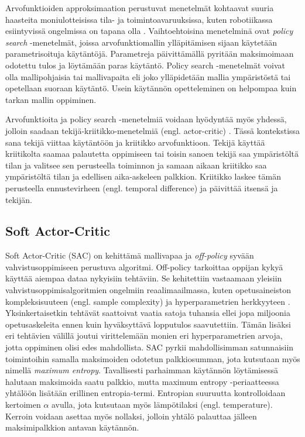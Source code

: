 \documentclass[utf8]{gradu3}
\begin{document}
Arvofunktioiden approksimaation perustuvat menetelmät kohtaavat suuria haasteita moniulotteisissa tila- ja toimintoavaruuksissa, kuten robotiikassa esiintyvissä ongelmissa on tapana olla \parencite{arulkumaran2017brief,deisenroth2013survey}. Vaihtoehtoisina menetelminä ovat \textit{policy search} -menetelmät, joissa arvofunktiomallin ylläpitämisen sijaan käytetään parametrisoituja käytäntöjä. Parametreja päivittämällä pyritään maksimoimaan odotettu tulos ja löytämään paras käytäntö. Policy search -menetelmät voivat olla mallipohjaisia tai mallivapaita eli joko ylläpidetään mallia ympäristöstä tai opetellaan suoraan käytäntö. Usein käytännön opetteleminen on helpompaa kuin tarkan mallin oppiminen.

Arvofunktioita ja policy search -menetelmiä voidaan hyödyntää myös yhdessä, jolloin saadaan tekijä-kriitikko-menetelmiä (engl. actor-critic) \parencite{arulkumaran2017brief}. Tässä kontekstissa sana tekijä viittaa käytäntöön ja kriitikko arvofunktioon. Tekijä käyttää kriitikolta saamaa palautetta oppimiseen tai toisin sanoen tekijä saa ympäristöltä tilan ja valitsee sen perusteella toiminnon ja samaan aikaan kriitikko saa ympäristöltä tilan ja edellisen aika-askeleen palkkion. Kriitikko laskee tämän perusteella ennustevirheen (engl. temporal difference) ja päivittää itsensä ja tekijän.

\subsection{Soft Actor-Critic}

Soft Actor-Critic (SAC) on \textcite{haarnoja2018soft} kehittämä mallivapaa ja \textit{off-policy} syvään vahvistusoppimiseen perustuva algoritmi. Off-policy tarkoittaa oppijan kykyä käyttää aiempaa dataa nykyisiin tehtäviin. Se kehitettiin vastaamaan yleisiin vahvistusoppimisalgoritmien ongelmiin reaalimaailmassa, kuten opetusaineiston kompleksisuuteen (engl. sample complexity) ja hyperparametrien herkkyyteen \parencite{haarnoja2018app}. Yksinkertaisetkin tehtävät saattoivat vaatia satoja tuhansia ellei jopa miljoonia opetusaskeleita ennen kuin hyväksyttävä lopputulos saavutettiin. Tämän lisäksi eri tehtävien välillä joutui virittelemään monien eri hyperparametrien arvoja, jotta oppiminen olisi edes mahdollista. SAC pyrkii mahdollisimman satunnaisiin toimintoihin samalla maksimoiden odotetun palkkiosumman, jota kutsutaan myös nimellä \textit{maximum entropy}. Tavallisesti parhaimman käytännön löytämisessä halutaan maksimoida saatu palkkio, mutta maximum entropy -periaatteessa yhtälöön lisätään erillinen entropia-termi. Entropian suuruutta kontrolloidaan kertoimen $\alpha$ avulla, jota kutsutaan myös lämpötilaksi (engl. temperature). Kerroin voidaan asettaa myös nollaksi, jolloin yhtälö palauttaa jälleen maksimipalkkion antavan käytännön.
\end{document}
